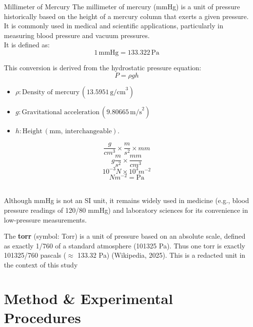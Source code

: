 \documentclass{article}
\begin{document}
\begin{briefillus}{Millimeter of Mercury}{}
	The millimeter of mercury (mmHg) is a unit of pressure historically based on the height of a mercury column that exerts a given pressure. It is commonly used in medical and scientific applications, particularly in measuring blood pressure and vacuum pressures.\\[8pt]
	It is defined as:
	\[1\,\text{mmHg} = 133.322\,\text{Pa}\]
	\begin{minipage}{0.9\textwidth}		
		This conversion is derived from the hydrostatic pressure equation:\\
		\[P = \rho g h\]
		\begin{itemize}[itemsep=-1mm]
			\item \(\rho : \text{Density of mercury}\, (13.5951 \, \text{g/cm}^3)\)
			\item \(g : \text{Gravitational acceleration}\, (9.80665 \, \text{m/s}^2)\)
			\item \(h : \text{Height}\, (\text{mm},\, \text{interchangeable})\).	
		\end{itemize}
	\end{minipage}\hspace{-7em}
	\begin{minipage}{0.2\textwidth}\vspace{-2em}
		$$\frac{g}{cm^3} \times \frac{m}{s^2} \times mm$$
		$$g\frac{m}{s^2} \times\frac{mm}{cm^3}$$
		$$10^{-3}N \times10^{3}m^{-2}$$
		$$N m^{-2} = \text{Pa}$$
	\end{minipage}\\[8pt]
	Although mmHg is not an SI unit, it remains widely used in medicine (e.g., blood pressure readings of 120/80 mmHg) and laboratory sciences for its convenience in low-pressure measurements.
\end{briefillus}\vspace{0em}\noindent\footnotesize{The \textbf{torr} (symbol: Torr) is a unit of pressure based on an absolute scale, defined as exactly 1/760 of a standard atmosphere (101325 Pa). Thus one torr is exactly 101325/760 pascals ($\approx$ 133.32 Pa) (Wikipedia, 2025). This is a redacted unit in the context of this study}
\tikzexternalenable

	
	\newpage\vspace*{-20pt}\large
	\section{Method \& Experimental Procedures}\label{Method_Experimental_Procedures}
\end{document}
